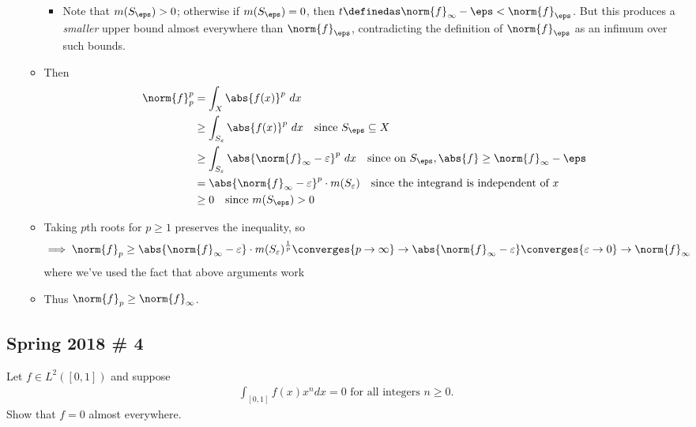 \begin{solution}
\begin{itemize}
\begin{itemize}
    \begin{itemize}
    \tightlist
    \item
      Note that \(m(S_\eps) > 0\); otherwise if \(m(S_\eps) = 0\), then
      \(t\definedas \norm{f}_\infty - \eps < \norm{f}_\eps\). But this
      produces a \emph{smaller} upper bound almost everywhere than
      \(\norm{f}_\eps\), contradicting the definition of
      \(\norm{f}_\eps\) as an infimum over such bounds.
    \end{itemize}
  \item
    Then \begin{align*}
    \norm{f}_p^p 
    &= \int_X \abs{f(x)}^p ~dx \\
    &\geq \int_{S_\varepsilon} \abs{f(x)}^p ~dx \quad\text{since } S_\eps \subseteq X \\
    &\geq \int_{S_\varepsilon} \abs{\norm{f}_\infty - \varepsilon}^p ~dx \quad\text{since on } S_\eps, \abs{f} \geq \norm{f}_\infty - \eps \\
    &= \abs{\norm{f}_\infty - \varepsilon}^p \cdot m(S_\varepsilon) \quad\text{since the integrand is independent of }x \\
    & \geq 0 \quad\text{since } m(S_\eps) > 0
    \end{align*}
  \item
    Taking \(p\)th roots for \(p\geq 1\) preserves the inequality, so
    \begin{align*}
    \implies \norm{f}_p &\geq \abs{\norm{f}_\infty - \varepsilon} \cdot m(S_\varepsilon)^{\frac 1 p} 
    \converges{p\to\infty}\to \abs{\norm{f}_\infty - \varepsilon} 
    \converges{\varepsilon \to 0}\to \norm{f}_\infty
    \end{align*} where we've used the fact that above arguments work
  \item
    Thus \(\norm{f}_p \geq \norm{f}_\infty\).
  \end{itemize}
\end{itemize}

\end{solution}

\hypertarget{spring-2018-4}{%
\subsection{Spring 2018 \# 4}\label{spring-2018-4}}

Let \(f\in L^2([0, 1])\) and suppose
\begin{align*}
\int _{[0,1]} f(x) x^{n} d x=0 \text { for all integers } n \geq 0.
\end{align*} Show that \(f = 0\) almost everywhere.

